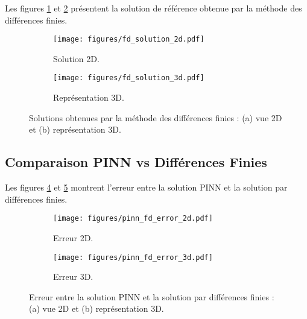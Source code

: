 \documentclass[11pt,a4paper]{article}
\begin{document}
Les figures \ref{fig:fd_solution_2d} et \ref{fig:fd_solution_3d} présentent la solution de référence obtenue par la méthode des différences finies.

\begin{figure}[H]
    \centering
    \begin{subfigure}{0.45\textwidth}
        \centering
        \texttt{[image: figures/fd\_solution\_2d.pdf]}
        \caption{Solution 2D.}
        \label{fig:fd_solution_2d}
    \end{subfigure}
    \hfill
    \begin{subfigure}{0.45\textwidth}
        \centering
        \texttt{[image: figures/fd\_solution\_3d.pdf]}
        \caption{Représentation 3D.}
        \label{fig:fd_solution_3d}
    \end{subfigure}
    \caption{Solutions obtenues par la méthode des différences finies : (a) vue 2D et (b) représentation 3D.}
    \label{fig:fd_solutions}
\end{figure}


\subsection{Comparaison PINN vs Différences Finies}

Les figures \ref{fig:pinn_error_2d} et \ref{fig:pinn_error_3d} montrent l'erreur entre la solution PINN et la solution par différences finies.



\begin{figure}[H]
    \centering
    \begin{subfigure}{0.45\textwidth}
        \centering
        \texttt{[image: figures/pinn\_fd\_error\_2d.pdf]}
        \caption{Erreur 2D.}
        \label{fig:pinn_error_2d}
    \end{subfigure}
    \hfill
    \begin{subfigure}{0.45\textwidth}
        \centering
        \texttt{[image: figures/pinn\_fd\_error\_3d.pdf]}
        \caption{Erreur 3D.}
        \label{fig:pinn_error_3d}
    \end{subfigure}


    \caption{Erreur entre la solution PINN et la solution par différences finies : (a) vue 2D et (b) représentation 3D.}
    \label{fig:pinn_fd_error}
\end{figure}
\end{document}

